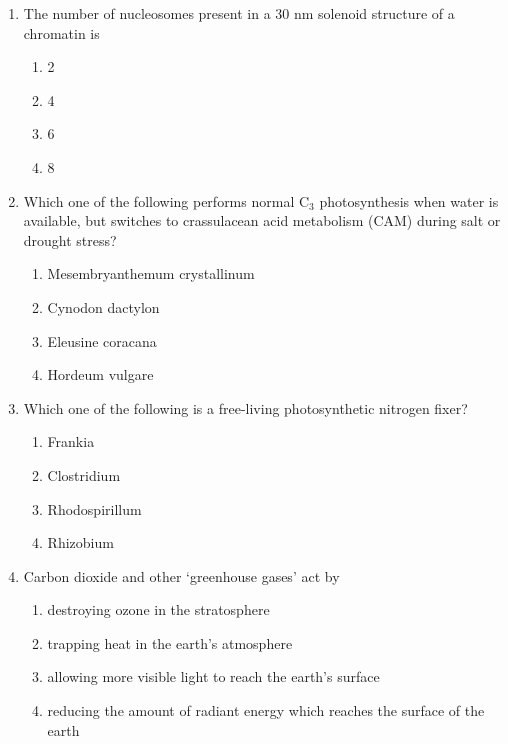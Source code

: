 \documentclass[journal,12pt,onecolumn]{IEEEtran}
\begin{document}
\begin{enumerate}[label=\arabic*.]
\item The number of nucleosomes present in a 30 nm solenoid structure of a chromatin is
\begin{multicols}{4}
\begin{enumerate}[label=(\Alph*)]
\item 2
\item 4
\item 6
\item 8
\end{enumerate}
\end{multicols}

\item Which one of the following performs normal C$_3$ photosynthesis when water is available, but switches to crassulacean acid metabolism (CAM) during salt or drought stress?
\begin{multicols}{2}
\begin{enumerate}[label=(\Alph*)]
\item Mesembryanthemum crystallinum
\item Cynodon dactylon
\item Eleusine coracana
\item Hordeum vulgare
\end{enumerate}
\end{multicols}

\item Which one of the following is a free-living photosynthetic nitrogen fixer?
\begin{multicols}{4}
\begin{enumerate}[label=(\Alph*)]
\item Frankia
\item Clostridium
\item Rhodospirillum
\item Rhizobium
\end{enumerate}
\end{multicols}

\item Carbon dioxide and other ‘greenhouse gases’ act by
\begin{enumerate}[label=(\Alph*)]
\item destroying ozone in the stratosphere
\item trapping heat in the earth’s atmosphere
\item allowing more visible light to reach the earth’s surface
\item reducing the amount of radiant energy which reaches the surface of the earth
\end{enumerate}


\end{enumerate}
\end{document}
